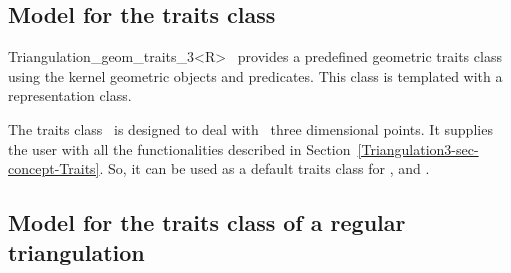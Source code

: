 	\subsection{Model for the traits class} 
	\label{Triangulation3-sec-class-Traits}

	\begin{ccClassTemplate}{Triangulation_geom_traits_3<R>}
\cgal\ provides a predefined geometric traits class using the kernel
geometric objects and predicates.
This class is templated with a representation class.

The traits class \ccClassTemplateName\ is designed to deal with \cgal\ three
dimensional points. It supplies the user with all
the functionalities described in
Section~\ref{Triangulation3-sec-concept-Traits}.
So, it can be used as a default traits
class for ,
 and
.


\ccTypes
{}

\ccGlue
{}
\ccGlue
{}
\ccGlue
{}

	\end{ccClassTemplate} 

	\subsection{Model for the traits class of a regular triangulation} 
	\label{Triangulation3-sec-class-Regulartraits}

